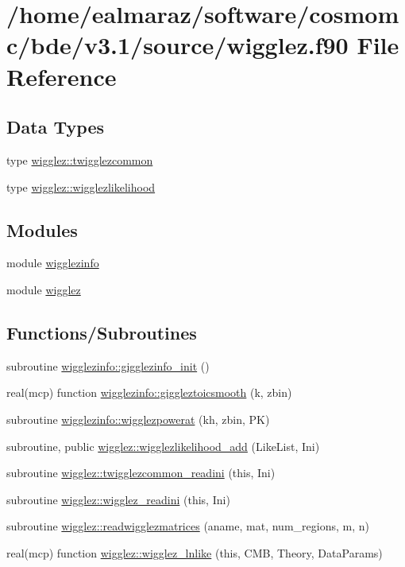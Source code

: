 \hypertarget{wigglez_8f90}{}\section{/home/ealmaraz/software/cosmomc/bde/v3.1/source/wigglez.f90 File Reference}
\label{wigglez_8f90}
\subsection*{Data Types}
\begin{DoxyCompactItemize}
\item 
type \mbox{\hyperlink{structwigglez_1_1twigglezcommon}{wigglez\+::twigglezcommon}}
\item 
type \mbox{\hyperlink{structwigglez_1_1wigglezlikelihood}{wigglez\+::wigglezlikelihood}}
\end{DoxyCompactItemize}
\subsection*{Modules}
\begin{DoxyCompactItemize}
\item 
module \mbox{\hyperlink{namespacewigglezinfo}{wigglezinfo}}
\item 
module \mbox{\hyperlink{namespacewigglez}{wigglez}}
\end{DoxyCompactItemize}
\subsection*{Functions/\+Subroutines}
\begin{DoxyCompactItemize}
\item 
subroutine \mbox{\hyperlink{namespacewigglezinfo_a7c041022fefbb50e12a454d1cc60c14f}{wigglezinfo\+::gigglezinfo\+\_\+init}} ()
\item 
real(mcp) function \mbox{\hyperlink{namespacewigglezinfo_aa01d4906da1313fa5a21d8f3b5029f50}{wigglezinfo\+::giggleztoicsmooth}} (k, zbin)
\item 
subroutine \mbox{\hyperlink{namespacewigglezinfo_acb08f5ab3e49247de82dbfb12666f12e}{wigglezinfo\+::wigglezpowerat}} (kh, zbin, PK)
\item 
subroutine, public \mbox{\hyperlink{namespacewigglez_ae540392aa1fd56601b1db55cac9aaafa}{wigglez\+::wigglezlikelihood\+\_\+add}} (Like\+List, Ini)
\item 
subroutine \mbox{\hyperlink{namespacewigglez_a0ccc7d6e7495d4d98fe5df0ae058145a}{wigglez\+::twigglezcommon\+\_\+readini}} (this, Ini)
\item 
subroutine \mbox{\hyperlink{namespacewigglez_ae3e0c03dabaa4af8dbaa3d5b1b2acb29}{wigglez\+::wigglez\+\_\+readini}} (this, Ini)
\item 
subroutine \mbox{\hyperlink{namespacewigglez_af7eacad18112700eeba576ce8376cb89}{wigglez\+::readwigglezmatrices}} (aname, mat, num\+\_\+regions, m, n)
\item 
real(mcp) function \mbox{\hyperlink{namespacewigglez_abf254c63c44f0ccf748dd90a0814a664}{wigglez\+::wigglez\+\_\+lnlike}} (this, C\+MB, Theory, Data\+Params)
\end{DoxyCompactItemize}
